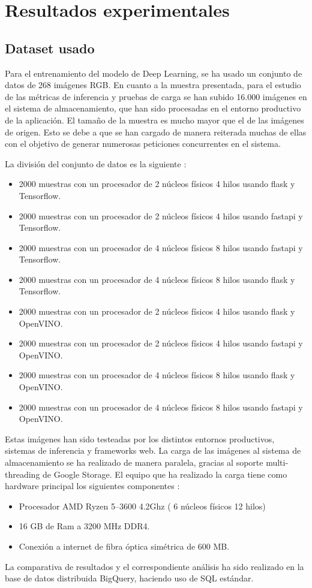 \mbox{}


\chapter{Resultados experimentales}
\label{ch:chapte5}


\section{Dataset usado}\label{sec:dataset-usado}
Para el entrenamiento del modelo de Deep Learning, se ha usado un conjunto de datos de 268 imágenes RGB\@.
En cuanto a la muestra presentada, para el estudio de las métricas de inferencia y pruebas de carga se han subido 16.000 imágenes en el sistema de almacenamiento, que han sido procesadas en el entorno productivo de la aplicación.
El tamaño de la muestra es mucho mayor que el de las imágenes de origen.
Esto se debe a que se han cargado de manera reiterada muchas de ellas con el objetivo de generar numerosas peticiones concurrentes en el sistema.

La división del conjunto de datos es la siguiente :
\begin{itemize}
    \item 2000 muestras con un procesador de 2 núcleos físicos 4 hilos usando flask y Tensorflow.
    \item 2000 muestras con un procesador de 2 núcleos físicos 4 hilos usando fastapi y Tensorflow.
    \item 2000 muestras con un procesador de 4 núcleos físicos 8 hilos usando fastapi y Tensorflow.
    \item 2000 muestras con un procesador de 4 núcleos físicos 8 hilos usando flask y Tensorflow.
    \item 2000 muestras con un procesador de 2 núcleos físicos 4 hilos usando flask y OpenVINO\@.
    \item 2000 muestras con un procesador de 2 núcleos físicos 4 hilos usando fastapi y OpenVINO\@.
    \item 2000 muestras con un procesador de 4 núcleos físicos 8 hilos usando flask y OpenVINO\@.
    \item 2000 muestras con un procesador de 4 núcleos físicos 8 hilos usando fastapi y OpenVINO\@.
\end{itemize}
Estas imágenes han sido testeadas por los distintos entornos productivos, sistemas de inferencia y frameworks web.
La carga de las imágenes al sistema de almacenamiento se ha realizado de manera paralela, gracias al soporte multi-threading de Google Storage.
El equipo que ha realizado la carga tiene como hardware principal los siguientes componentes :
\begin{itemize}
    \item Procesador AMD Ryzen 5--3600 4.2Ghz ( 6 núcleos físicos 12 hilos)
    \item 16 GB de Ram a 3200 MHz DDR4.
    \item Conexión a internet de fibra óptica simétrica de 600 MB\@.
\end{itemize}
La comparativa de resultados y el correspondiente análisis ha sido realizado en la base de datos distribuida BigQuery, haciendo uso de SQL estándar.


